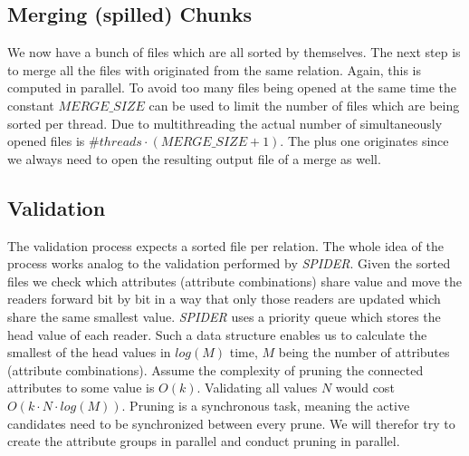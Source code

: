 \subsection{Merging (spilled) Chunks}
We now have a bunch of files which are all sorted by themselves. The next step is to merge all the files with originated from the same relation. Again, this is computed in parallel. To avoid too many files being opened at the same time the constant $MERGE\_SIZE$ can be used to limit the number of files which are being sorted per thread. Due to multithreading the actual number of simultaneously opened files is $\#threads \cdot (MERGE\_SIZE + 1)$. The plus one originates since we always need to open the resulting output file of a merge as well.

\subsection{Validation}
The validation process expects a sorted file per relation. The whole idea of the process works analog to the validation performed by \textit{SPIDER}. Given the sorted files we check which attributes (attribute combinations) share value and move the readers forward bit by bit in a way that only those readers are updated which share the same smallest value. \textit{SPIDER} uses a priority queue which stores the head value of each reader. Such a data structure enables us to calculate the smallest of the head values in $log(M)$ time, $M$ being the number of attributes (attribute combinations). Assume the complexity of pruning the connected attributes to some value is $O(k)$. Validating all values $N$ would cost $O(k \cdot N \cdot log(M))$. Pruning is a synchronous task, meaning the active candidates need to be synchronized between every prune. We will therefor try to create the attribute groups in parallel and conduct pruning in parallel.

